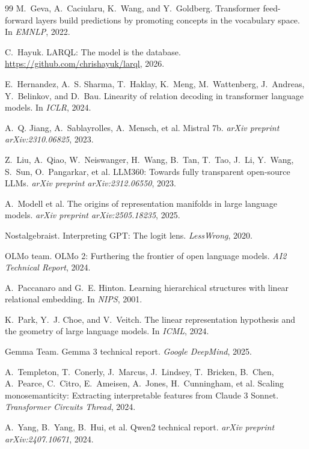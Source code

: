 \documentclass[11pt,letterpaper]{article}
\begin{document}
\begin{thebibliography}{99}
M.~Geva, A.~Caciularu, K.~Wang, and Y.~Goldberg.
\newblock Transformer feed-forward layers build predictions by promoting concepts in the vocabulary space.
\newblock In \emph{EMNLP}, 2022.

C.~Hayuk.
\newblock LARQL: The model is the database.
\newblock \url{https://github.com/chrishayuk/larql}, 2026.

E.~Hernandez, A.~S. Sharma, T.~Haklay, K.~Meng, M.~Wattenberg, J.~Andreas, Y.~Belinkov, and D.~Bau.
\newblock Linearity of relation decoding in transformer language models.
\newblock In \emph{ICLR}, 2024.

A.~Q. Jiang, A.~Sablayrolles, A.~Mensch, et al.
\newblock Mistral 7b.
\newblock \emph{arXiv preprint arXiv:2310.06825}, 2023.

Z.~Liu, A.~Qiao, W.~Neiswanger, H.~Wang, B.~Tan, T.~Tao, J.~Li, Y.~Wang, S.~Sun, O.~Pangarkar, et al.
\newblock LLM360: Towards fully transparent open-source LLMs.
\newblock \emph{arXiv preprint arXiv:2312.06550}, 2023.

A.~Modell et al.
\newblock The origins of representation manifolds in large language models.
\newblock \emph{arXiv preprint arXiv:2505.18235}, 2025.

Nostalgebraist.
\newblock Interpreting GPT: The logit lens.
\newblock \emph{LessWrong}, 2020.

OLMo team.
\newblock OLMo 2: Furthering the frontier of open language models.
\newblock \emph{AI2 Technical Report}, 2024.

A.~Paccanaro and G.~E. Hinton.
\newblock Learning hierarchical structures with linear relational embedding.
\newblock In \emph{NIPS}, 2001.

K.~Park, Y.~J. Choe, and V.~Veitch.
\newblock The linear representation hypothesis and the geometry of large language models.
\newblock In \emph{ICML}, 2024.

Gemma Team.
\newblock Gemma 3 technical report.
\newblock \emph{Google DeepMind}, 2025.

A.~Templeton, T.~Conerly, J.~Marcus, J.~Lindsey, T.~Bricken, B.~Chen, A.~Pearce, C.~Citro, E.~Ameisen, A.~Jones, H.~Cunningham, et al.
\newblock Scaling monosemanticity: Extracting interpretable features from Claude 3 Sonnet.
\newblock \emph{Transformer Circuits Thread}, 2024.

A.~Yang, B.~Yang, B.~Hui, et al.
\newblock Qwen2 technical report.
\newblock \emph{arXiv preprint arXiv:2407.10671}, 2024.

\end{thebibliography}
\end{document}

